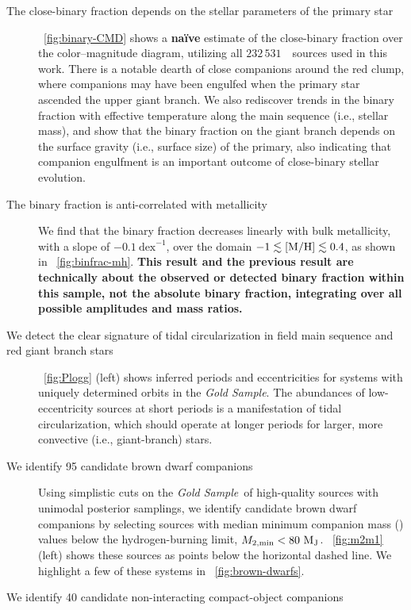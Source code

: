 \documentclass[modern]{aastex63}
\newcommand{\changes}[1]{{\bf\color{purple}#1}}
\newcommand{\nsources}{\ensuremath{232\,531}}
\newcommand{\goldsample}{\textit{Gold Sample}}
\begin{document}
\begin{description}
    \item[The close-binary fraction depends on the stellar parameters of the
    primary star] \figurename~\ref{fig:binary-CMD} shows a \changes{na\"ive} estimate of
    the close-binary fraction over the color--magnitude diagram, utilizing all
    \nsources\ \apogee\ sources used in this work. There is a notable dearth of
    close companions around the red clump, where companions may have been
    engulfed when the primary star ascended the upper giant branch. We also
    rediscover trends in the binary fraction with effective temperature along
    the main sequence (i.e., stellar mass), and show that the binary fraction on
    the giant branch depends on the surface gravity (i.e., surface size) of the
    primary, also indicating that companion engulfment is an important outcome
    of close-binary stellar evolution.
    \item[The binary fraction is anti-correlated with metallicity] We find that
    the binary fraction decreases linearly with bulk metallicity, with a slope
    of $-0.1~\textrm{dex}^{-1}$, over the domain $-1 \lesssim {[{\rm M}/{\rm H}]} \lesssim 0.4$,
    as shown in \figurename~\ref{fig:binfrac-mh}.
    \changes{This result and the previous result are technically about
      the observed or detected binary fraction within this sample, not
      the absolute binary fraction, integrating over all possible
      amplitudes and mass ratios.}
  \item[We detect the clear signature of tidal circularization in field main
    sequence and red giant branch stars] \figurename~\ref{fig:Plogg} (left)
    shows inferred periods and eccentricities for systems with
    uniquely determined orbits in the \goldsample.
    The abundances of low-eccentricity sources at short periods is a
    manifestation of tidal circularization, which should operate at longer
    periods for larger, more convective (i.e., giant-branch) stars.
    \item[We identify 95 candidate brown dwarf companions] Using simplistic cuts
    on the \goldsample\ of high-quality sources with unimodal posterior
    samplings, we identify candidate brown dwarf companions by selecting sources
    with median minimum companion mass (\mtwomin) values below the
    hydrogen-burning limit, $M_{2, {\rm min}} < 80~\mathrm{M}_{\mathrm{J}}$. \figurename~\ref{fig:m2m1}
    (left) shows these sources as points below the horizontal dashed line. We
    highlight a few of these systems in \figurename~\ref{fig:brown-dwarfs}.
    \item[We identify 40 candidate non-interacting compact-object companions]

\end{description}
\end{document}
